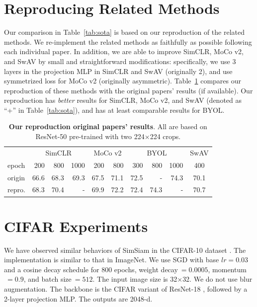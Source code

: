 \documentclass[final]{cvpr}
\newcommand{\tablestyle}[2]{\setlength{\tabcolsep}{#1}\renewcommand{\arraystretch}{#2}\centering\footnotesize}
\begin{document}
\section{Reproducing Related Methods}

Our comparison in Table~\ref{tab:sota} is based on our reproduction of the related methods. We re-implement the related methods as faithfully as possible following each individual paper. In addition, we are able to improve SimCLR, MoCo v2, and SwAV by small and straightforward modifications: specifically, we use 3 layers in the projection MLP in SimCLR and SwAV (\vs originally 2), and use symmetrized loss for MoCo v2 (\vs originally asymmetric). Table~\ref{tab:repro} compares our reproduction of these methods with the original papers' results (if available). Our reproduction has \emph{better} results for SimCLR, MoCo v2, and SwAV (denoted as ``+'' in Table~\ref{tab:sota}), and has at least comparable results for BYOL.

\begin{table}[t]
\centering
\small
\tablestyle{4pt}{1.1}
\begin{tabular}{l | rrr | rr | rrr | c }
& \multicolumn{3}{c|}{SimCLR}
& \multicolumn{2}{c|}{MoCo v2}
& \multicolumn{3}{c|}{BYOL}
& \multicolumn{1}{c}{SwAV}
\\
epoch
& 200 & 800 & 1000  %
& 200 & 800  %
& 300 & 800 & 1000  %
& 400  %
\\
\shline
origin
& 66.6 & 68.3 & 69.3  %
& 67.5 & 71.1  %
& 72.5 & - & 74.3  %
& 70.1   %
\\
repro.
& 68.3 & 70.4 & -  %
& 69.9 & 72.2  %
& 72.4 & 74.3 & -  %
& 70.7   %
\end{tabular}
\vspace{.3em}
\caption{
\textbf{Our reproduction \vs original papers' results}. All are based on ResNet-50 pre-trained with two 224$\times$224 crops.
\label{tab:repro}
\vspace{-.5em}
}
\end{table}

\section{CIFAR Experiments}

We have observed similar behaviors of SimSiam in the CIFAR-10 dataset \cite{Krizhevsky2009}.
The implementation is similar to that in ImageNet.
We use SGD with base $lr\!=\!0.03$ and a cosine decay schedule for 800 epochs, weight decay$~\!=\!0.0005$, momentum$~\!=\!0.9$, and batch size$~\!=\!512$. The input image size is 32$\times$32. We do not use blur augmentation. The backbone is the CIFAR variant of ResNet-18 \cite{He2016}, followed by a 2-layer projection MLP. The outputs are 2048-d.
\end{document}
